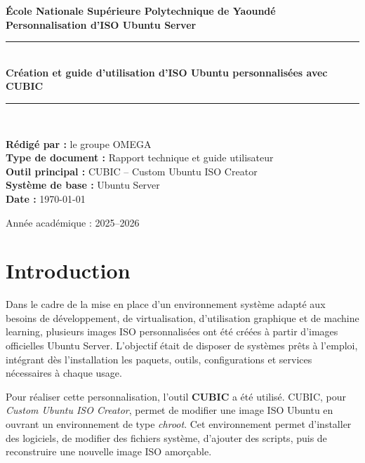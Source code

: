 \documentclass[12pt,a4paper]{article}
\newcommand{\Auteur}{le groupe OMEGA}
\newcommand{\Institution}{École Nationale Supérieure Polytechnique de Yaoundé}
\newcommand{\Projet}{Personnalisation d'ISO Ubuntu Server}
\newcommand{\DateRapport}{\today}
\begin{document}
\begin{titlepage}
    \centering
    \vspace*{1cm}
    {\Large \textbf{\Institution}}\\[1.2cm]
    {\Large \textbf{\Projet}}\\[0.8cm]
    \rule{0.85\textwidth}{0.6pt}\\[0.6cm]
    {\Huge \textbf{Création et guide d'utilisation d'ISO Ubuntu personnalisées avec CUBIC}}\\[0.6cm]
    \rule{0.85\textwidth}{0.6pt}\\[1.2cm]
    
    \begin{flushleft}
        \textbf{Rédigé par :} \Auteur\\[0.3cm]
        \textbf{Type de document :} Rapport technique et guide utilisateur\\[0.3cm]
        \textbf{Outil principal :} CUBIC -- Custom Ubuntu ISO Creator\\[0.3cm]
        \textbf{Système de base :} Ubuntu Server\\[0.3cm]
        \textbf{Date :} \DateRapport
    \end{flushleft}
    
    \vfill
    {\large Année académique : 2025--2026}
\end{titlepage}

\tableofcontents
\newpage

\section{Introduction}

Dans le cadre de la mise en place d'un environnement système adapté aux besoins de développement, de virtualisation, d'utilisation graphique et de machine learning, plusieurs images ISO personnalisées ont été créées à partir d'images officielles Ubuntu Server. L'objectif était de disposer de systèmes prêts à l'emploi, intégrant dès l'installation les paquets, outils, configurations et services nécessaires à chaque usage.

Pour réaliser cette personnalisation, l'outil \textbf{CUBIC} a été utilisé. CUBIC, pour \textit{Custom Ubuntu ISO Creator}, permet de modifier une image ISO Ubuntu en ouvrant un environnement de type \textit{chroot}. Cet environnement permet d'installer des logiciels, de modifier des fichiers système, d'ajouter des scripts, puis de reconstruire une nouvelle image ISO amorçable.
\end{document}
